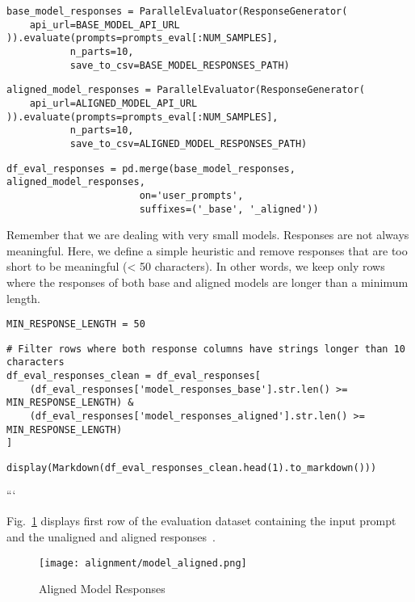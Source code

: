 \begin{verbatim}
base_model_responses = ParallelEvaluator(ResponseGenerator(
    api_url=BASE_MODEL_API_URL
)).evaluate(prompts=prompts_eval[:NUM_SAMPLES],
           n_parts=10,
           save_to_csv=BASE_MODEL_RESPONSES_PATH)
\end{verbatim}

\begin{verbatim}
aligned_model_responses = ParallelEvaluator(ResponseGenerator(
    api_url=ALIGNED_MODEL_API_URL
)).evaluate(prompts=prompts_eval[:NUM_SAMPLES], 
           n_parts=10, 
           save_to_csv=ALIGNED_MODEL_RESPONSES_PATH)
\end{verbatim}

\begin{verbatim}
df_eval_responses = pd.merge(base_model_responses, aligned_model_responses, 
                       on='user_prompts',
                       suffixes=('_base', '_aligned'))
\end{verbatim}

Remember that we are dealing with very small models. Responses are not always meaningful. Here, we define a simple heuristic and remove responses that are too short to be meaningful (< 50 characters). In other words, we keep only rows where the responses of both base and aligned models are longer than a minimum length.

\begin{verbatim}
MIN_RESPONSE_LENGTH = 50
\end{verbatim}

\begin{verbatim}
# Filter rows where both response columns have strings longer than 10 characters
df_eval_responses_clean = df_eval_responses[
    (df_eval_responses['model_responses_base'].str.len() >= MIN_RESPONSE_LENGTH) & 
    (df_eval_responses['model_responses_aligned'].str.len() >= MIN_RESPONSE_LENGTH)
]
\end{verbatim}

\begin{verbatim}
display(Markdown(df_eval_responses_clean.head(1).to_markdown()))
\end{verbatim}
```

Fig.~\ref{fig:model-aligned} displays first row of the evaluation dataset containing the input prompt and the unaligned and aligned responses~.

\begin{figure}[H]
\centering
\texttt{[image: alignment/model\_aligned.png]}
\caption{Aligned Model Responses}
\label{fig:model-aligned}
\end{figure}

